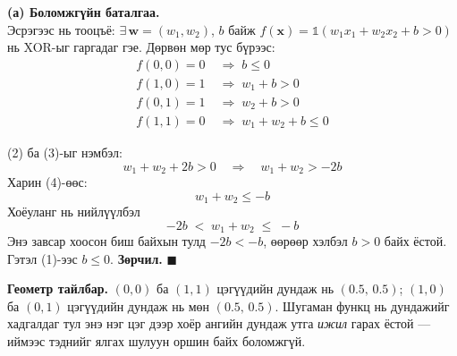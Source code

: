 \documentclass[11pt]{article}
\newenvironment{solution}[1][\textbf{Бодолт.}]
    { \noindent #1 \smallskip \\ }
    { \medskip }
\begin{document}
\begin{solution}[\textbf{(а) Боломжгүйн баталгаа.}]
Эсрэгээс нь тооцъё: $\exists\, \mathbf{w}=(w_1,w_2)$, $b$ байж
$f(\mathbf{x}) = \mathbb{1}(w_1x_1 + w_2x_2 + b > 0)$ нь XOR-ыг гаргадаг гэе.
Дөрвөн мөр тус бүрээс:
\begin{align}
f(0,0) = 0 &\;\Longrightarrow\; b \le 0 \\
f(1,0) = 1 &\;\Longrightarrow\; w_1 + b > 0 \\
f(0,1) = 1 &\;\Longrightarrow\; w_2 + b > 0 \\
f(1,1) = 0 &\;\Longrightarrow\; w_1 + w_2 + b \le 0
\end{align}

(2) ба (3)-ыг нэмбэл:
\[
w_1 + w_2 + 2b > 0 \quad\Longrightarrow\quad w_1 + w_2 > -2b
\]
Харин (4)-өөс:
\[
w_1 + w_2 \le -b
\]
Хоёуланг нь нийлүүлбэл
\[
-2b \;<\; w_1 + w_2 \;\le\; -b
\]
Энэ завсар хоосон биш байхын тулд $-2b < -b$, өөрөөр хэлбэл $\boxed{b > 0}$ байх ёстой.
Гэтэл (1)-ээс $b \le 0$. \textbf{Зөрчил.} $\blacksquare$

\medskip
\textbf{Геометр тайлбар.} $(0,0)$ ба $(1,1)$ цэгүүдийн дундаж нь $(0.5,\,0.5)$;
$(1,0)$ ба $(0,1)$ цэгүүдийн дундаж нь мөн $(0.5,\,0.5)$. Шугаман функц нь дундажийг
хадгалдаг тул энэ нэг цэг дээр хоёр ангийн дундаж утга \emph{ижил} гарах ёстой —
иймээс тэднийг ялгах шулуун оршин байх боломжгүй.
\end{solution}
\end{document}
